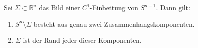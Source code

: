 \begin{satz}
    Sei $\Sigma \subset \mathbb{R}^{n}$ das Bild einer $C^1$-Einbettung von $S^{n-1}$. Dann gilt: \begin{enumerate}
        \item $S^n \setminus \Sigma$ besteht aus genau zwei Zusammenhangskomponenten.
        \item $\Sigma$ ist der Rand jeder dieser Komponenten.
    \end{enumerate} 
\end{satz}

